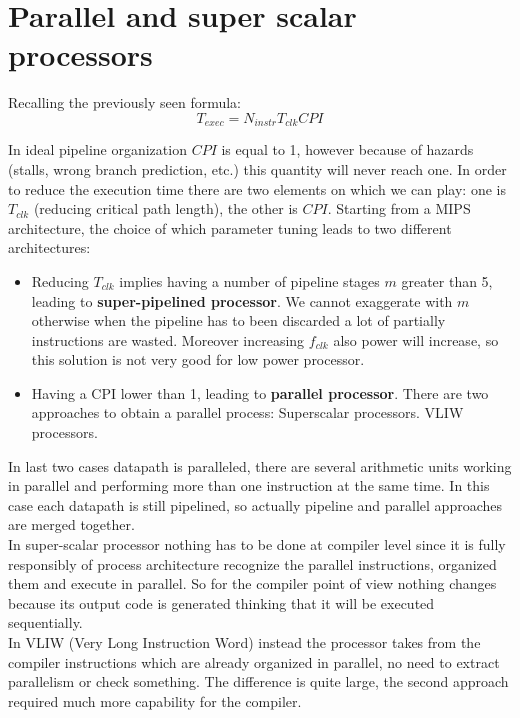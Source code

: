 \chapter{Parallel and super scalar processors}

Recalling the previously seen formula:
$$T_{exec}=N_{instr}T_{clk} CPI$$

In ideal pipeline organization $CPI$ is equal to 1, however because of hazards (stalls, wrong branch prediction, etc.) this quantity will never reach one. In order to reduce the execution time there are two elements on which we can play: one is $T_{clk}$ (reducing critical path length), the other is $CPI$. Starting from a MIPS architecture, the choice of which parameter tuning leads to two different architectures:
\begin{itemize}
  \item Reducing $T_{clk}$ implies having a number of pipeline stages $m$ greater than 5, leading to \textbf{super-pipelined processor}. We cannot exaggerate with $m$ otherwise when the pipeline has to been discarded a lot of partially instructions are wasted. Moreover increasing $f_{clk}$ also power will increase, so this solution is not very good for low power processor.

  \item Having a CPI lower than 1, leading to \textbf{parallel processor}. There are two approaches to obtain a parallel process:
    \subitem Superscalar processors.
    \subitem VLIW processors.

\end{itemize}

In last two cases datapath is paralleled, there are several arithmetic units working in parallel and performing more than one instruction at the same time. In this case each datapath is still pipelined, so actually pipeline and parallel approaches are merged together.\\
In super-scalar processor nothing has to be done at compiler level since it is fully responsibly of process architecture recognize the parallel instructions, organized them and execute in parallel. So for the compiler point of view nothing changes because its output code is generated thinking that it will be executed sequentially.\\
In VLIW (Very Long Instruction Word) instead the processor takes from the compiler instructions which are already organized in parallel, no need to extract parallelism or check something. The difference is quite large, the second approach required much more capability for the compiler.

